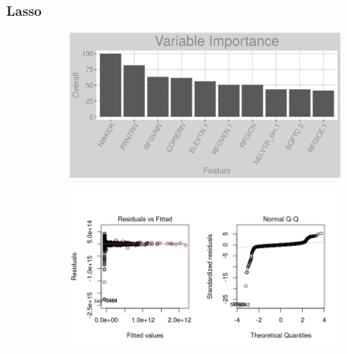 \subsubsection{Lasso}
\label{appendix:electricity:l}
\begin{figure}[h]
\centering
\begin{subfigure}{1\textwidth}
\centering
\includegraphics[width=.99\textwidth, height=0.3\textheight]{Images/electricity_l_vars.png}
\end{subfigure}
\begin{subfigure}{1\textwidth}
\centering
\includegraphics[width=.99\textwidth, height=0.475\textheight]{Images/electricity_l_res_1.png}
\end{subfigure}
\end{figure}
\FloatBarrier
\newpage
